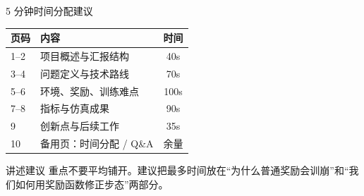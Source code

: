 \documentclass[aspectratio=169,11pt]{ctexbeamer}
\begin{document}
\begin{frame}{5 分钟时间分配建议}
  \begin{tabular}{llc}
    \toprule
    页码 & 内容 & 时间 \\
    \midrule
    1--2 & 项目概述与汇报结构 & 40s \\
    3--4 & 问题定义与技术路线 & 70s \\
    5--6 & 环境、奖励、训练难点 & 100s \\
    7--8 & 指标与仿真成果 & 90s \\
    9 & 创新点与后续工作 & 35s \\
    10 & 备用页：时间分配 / Q\&A & 余量 \\
    \bottomrule
  \end{tabular}

  \vspace{1em}
  \begin{block}{讲述建议}
    重点不要平均铺开。建议把最多时间放在“为什么普通奖励会训崩”和“我们如何用奖励函数修正步态”两部分。
  \end{block}
\end{frame}
\end{document}
